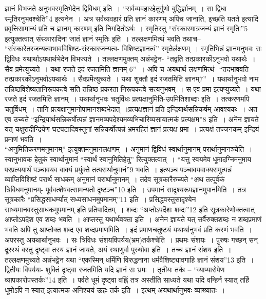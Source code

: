 {ज्ञानं विभजते अनुभवस्मृतिभेदेन द्विविधम् इति~। “सर्वव्यवहारहेतुर्गुणो बुद्धिर्ज्ञानम्~। सा द्विधा स्मृतिरनुभवश्चेति”4 इत्यनेन~। अत्र सर्वव्यवहारं प्रति ज्ञानं कारणम् अपिच जानाति, इच्छति यतते इत्यादि प्रवृत्तिसामान्यं प्रति च ज्ञानम् कारणम् इति निगदितोऽर्थः~। स्मृतिस्तु “संस्कारमात्रजन्यं ज्ञानं स्मृतिः”5 इत्युक्तत्वात् संस्कारादिना जातं ज्ञानं स्मृतिः इति~। तल्लक्षणमित्थं भवति तथाच– “संस्कारेतरजन्यत्वाभावविशिष्ट-संस्कारजन्यत्व- विशिष्टज्ञानत्वं” स्मृतेर्लक्षणम्~। स्मृतिभिन्नं ज्ञानमनुभवः सः द्विविधः यथार्थाऽयथार्थभेदेन विभज्यते~। तल्लक्षणमुक्तम् अन्नंभट्टेन- “तद्वति तत्प्रकारकॊऽनुभवो यथार्थः~। सैव प्रमेत्युच्यते~। यथा रजते इदं रजतमिति ज्ञानम् 6”~। अपि च अयथार्थ लक्षणमित्थं- “तदभाववति तत्प्रकारकॊऽनुभवोऽयथार्थः~। सैवप्रमॆत्युच्यते~। यथा शुक्तौ इदं रजतमिति ज्ञानम्7”~। यथार्थानुभवो नाम तन्निष्ठविशेष्यतानिरूपकत्वे सति तन्निष्ठ प्रकरता निरूपकत्वे सत्यनुभवम्~। स एव प्रमा इत्यप्युच्यते~। यथा रजते इदं रजतमिति ज्ञानम्~। यथार्थानुभवः चतुर्विधः प्रत्यक्षानुमिति-उपमितिशाब्दाः इति~। तत्करणमपि चतुर्विधम्~। तानि प्रत्यक्षानुमानोपामानशब्दभेदात्~।\break प्रत्यक्षज्ञानं प्रति इन्द्रियार्थसन्निकर्षम् आवश्यकः~। अत एव उच्यते “इन्द्रियार्थसन्निकर्षोत्पन्नं ज्ञानमव्यपदेश्यमव्यभिचारिव्यसायात्मकं प्रत्यक्षम”8 इति~। अनॆन ज्ञायते यत् चक्षुरादीन्द्रियेण घटपटादिवस्तूनां सन्निकर्षोत्पन्नं भ्रमरहितं ज्ञानं प्रत्यक्ष प्रमा~। प्रत्यक्षं तज्जनकम् इन्द्रियं प्रमाणं भवति~। 
~\\[0.2cm]
“अनुमितिकरणमनुमानम्” इत्युक्तमनुमानलक्षणम्~। अनुमानं द्विविधं स्वार्थानुमानम् परार्थानुमानञ्चेति~। स्वानुभावक हेतुकं स्वार्थानुमानं “स्वार्थं स्वानुमितिहेतु” रित्युक्तत्वात्~। \hbox{“यत्तु} स्वयमेव धूमादग्निमनुमाय परप्रत्ययार्थं पञ्चावयव वाक्यं प्रयुंक्ते तत्परार्थानुमानं”9 भवति~। इत्थञ्च पञ्चावयवाक्यसमुत्पन्नं व्याप्तिविशिष्टं परार्थ साधकम् अनुमानं परार्थानुमानम्~। तदेव सूत्रकारैरुच्यते “अथ तत्पूर्वकं त्रिविधमनुमानम्- पूर्ववत्शेषवत्सामन्यतो दृष्टञ्च”10 इति~। उपमानं सादृश्यरूपज्ञानमुपानमिति~। तत्र सूत्रकारैः “प्रसिद्धसाधर्म्यात् सध्यसाधनमुपमानम्”11 इति~। प्रसिद्धवस्तुसादृश्येन साध्यमानवस्तुसाधकमुपमानम् इति प्रतिपादितम्~। \hbox{शब्दः} “अप्तोऽपदॆशः शब्दः”12 इति सूत्रकारेणोक्तत्वात् आप्तोऽपदॆश एव शब्दः भवति~। \hbox{आप्तस्तु} यथार्थवक्ता इति~। अनेन ज्ञायते यत् सर्वैरुक्तशब्दः न शब्दप्रमाणं भवति अपि तु आप्तोक्त शब्द एव शब्दप्रमाणमिति~। इदं प्रमाणचतुष्टयं यथार्थानुभवं प्रति करणं भवति~। अपरस्तु अयथार्थानुभवः~। सः त्रिविधः संशयविपर्यय(भ्रम)तर्कश्चेति~। प्रथमः संशयः~। पुरुषः गच्छन् सन् दूरस्थं वस्तु दृष्ट्वा तस्य ज्ञानं जायते, अयं स्थाणुर्वा पुरुषोवा इति~। तच्च ज्ञानं संशय इति~। तल्लक्षणमुच्यते अन्नंभट्टेन यथा “एकस्मिन् धर्मिणि विरुद्धनाना धर्मवैशिष्ट्यावगाहि ज्ञानं संशय”13 इति~। द्वितीयः विपर्ययः- शुक्तिं दृष्ट्वा रजतमिति यदि ज्ञानं सः भ्रमः~। \hbox{तृतीयः} तर्कः – “व्याप्यारोपेण व्यापकारोपस्तर्कः”14 इति~। पर्वते धूमं दृष्ट्वा वह्निं तत्र अस्तीति \hbox{साध्यते} यथा यदि वन्हिर्न स्यात् तर्हि धूमोऽपि न स्यात् इत्यात्मक अनिश्चयं ऊहः तर्क इति~। इत्थम् अयथार्थानुभवः व्याख्यातः~। 

}
